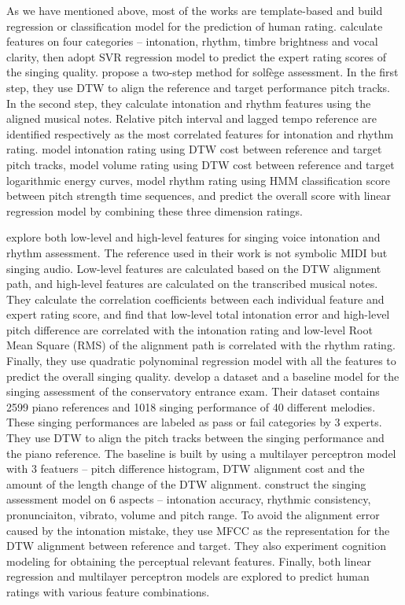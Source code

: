 As we have mentioned above, most of the works are template-based and build regression or classification model for the prediction of human rating.  calculate features on four categories -- intonation, rhythm, timbre brightness and vocal clarity, then adopt \gls{SVR} regression model to predict the expert rating scores of the singing quality.  propose a two-step method for solfège assessment. In the first step, they use \gls{DTW} to align the reference and target performance pitch tracks. In the second step, they calculate intonation and rhythm features using the aligned musical notes. Relative pitch interval and lagged tempo reference are identified respectively as the most correlated features for intonation and rhythm rating.  model intonation rating using \gls{DTW} cost between reference and target pitch tracks, model volume rating using \gls{DTW} cost between reference and target logarithmic energy curves, model rhythm rating using \gls{HMM} classification score between pitch strength time sequences, and predict the overall score with linear regression model by combining these three dimension ratings. 

 explore both low-level and high-level features for singing voice intonation and rhythm assessment. The reference used in their work is not symbolic MIDI but singing audio. Low-level features are calculated based on the \gls{DTW} alignment path, and high-level features are calculated on the transcribed musical notes. They calculate the correlation coefficients between each individual feature and expert rating score, and find that low-level total intonation error and high-level pitch difference are correlated with the intonation rating and low-level Root Mean Square (RMS) of the alignment path is correlated with the rhythm rating. Finally, they use quadratic polynominal regression model with all the features to predict the overall singing quality.  develop a dataset and a baseline model for the singing assessment of the conservatory entrance exam. Their dataset contains 2599 piano references and 1018 singing performance of 40 different melodies. These singing performances are labeled as pass or fail categories by 3 experts. They use \gls{DTW} to align the pitch tracks between the singing performance and the piano reference. The baseline is built by using a multilayer perceptron model with 3 featuers -- pitch difference histogram, \gls{DTW} alignment cost and the amount of the length change of the \gls{DTW} alignment.  construct the singing assessment model on 6 aspects -- intonation accuracy, rhythmic consistency, pronunciaiton, vibrato, volume and pitch range. To avoid the alignment error caused by the intonation mistake, they use \gls{MFCC} as the representation for the \gls{DTW} alignment between reference and target. They also experiment cognition modeling for obtaining the perceptual relevant features. Finally, both linear regression and multilayer perceptron models are explored to predict human ratings with various feature combinations.

